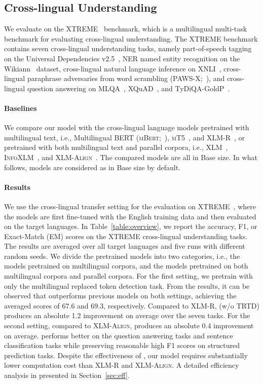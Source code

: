 \documentclass[11pt]{article}
\newcommand\our{\makebox{\textsc{XLM-E}}}
\begin{document}
\subsection{Cross-lingual Understanding}

We evaluate \our{} on the XTREME~\cite{xtreme} benchmark, which is a multilingual multi-task benchmark for evaluating cross-lingual understanding. The XTREME benchmark contains seven cross-lingual understanding tasks, namely part-of-speech tagging on the Universal Dependencies v2.5~\cite{udpos}, NER named entity recognition on the Wikiann~\cite{panx,rahimi2019} dataset, cross-lingual natural language inference on XNLI~\cite{xnli}, cross-lingual paraphrase adversaries from word scrambling (PAWS-X;~\citealt{pawsx}), and cross-lingual question answering on MLQA~\cite{mlqa}, XQuAD~\cite{xquad}, and TyDiQA-GoldP~\cite{tydiqa}.

\paragraph{Baselines}

We compare our \our{} model with the cross-lingual language models pretrained with multilingual text, i.e., Multilingual BERT (\textsc{mBert};~\citealt{bert}), \textsc{mT5}~\cite{mt5}, and XLM-R~\cite{xlmr}, or pretrained with both multilingual text and parallel corpora, i.e., XLM~\cite{xlm}, \textsc{InfoXLM}~\cite{infoxlm}, and \textsc{XLM-Align}~\cite{xlmalign}. 
The compared models are all in Base size. In what follows, models are considered as in Base size by default.


\paragraph{Results}

We use the cross-lingual transfer setting for the evaluation on XTREME~\cite{xtreme}, where the models are first fine-tuned with the English training data and then evaluated on the target languages.
In Table~\ref{table:overview}, we report the accuracy, F1, or Exact-Match (EM) scores on the XTREME cross-lingual understanding tasks. The results are averaged over all target languages and five runs with different random seeds.
We divide the pretrained models into two categories, i.e., the models pretrained on multilingual corpora, and the models pretrained on both multilingual corpora and parallel corpora. For the first setting, we pretrain \our{} with only the multilingual replaced token detection task.
From the results, it can be observed that \our{} outperforms previous models on both settings, achieving the averaged scores of 67.6 and 69.3, respectively. Compared to \textsc{XLM-R}, \our{} (w/o TRTD) produces an absolute 1.2 improvement on average over the seven tasks. For the second setting, compared to \textsc{XLM-Align}, \our{} produces an absolute 0.4 improvement on average. 
\our{} performs better on the question answering tasks and sentence classification tasks while preserving reasonable high F1 scores on structured prediction tasks. 
Despite the effectiveness of \our{}, our model requires substantially lower computation cost than \textsc{XLM-R} and \textsc{XLM-Align}. A detailed efficiency analysis in presented in Section~\ref{sec:eff}.
\end{document}
